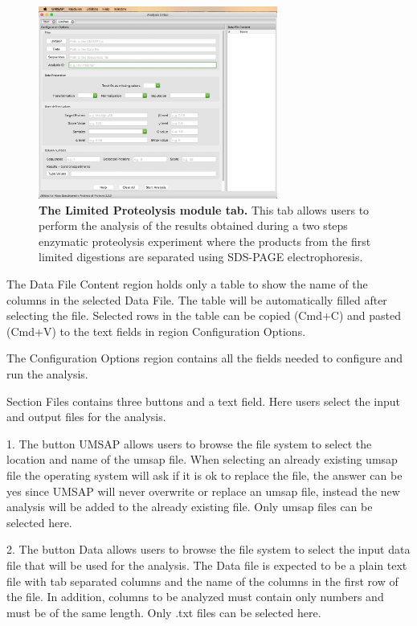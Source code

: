\begin{figure}[h]
    \centering
    \includegraphics[width=0.7\textwidth]{./IMAGES/MOD-LIMPROT/limprot-mod.jpg}
    \caption[The Limited Proteolysis module tab]{\textbf{The Limited Proteolysis
    module tab.} This tab allows users to perform the analysis of the results obtained
    during a two steps enzymatic proteolysis experiment where the products from the
    first limited digestions are separated using SDS-PAGE electrophoresis.}
    \label{fig:limprotTab}
    \vspace{-5pt}
\end{figure}

The Data File Content region holds only a table to show the name of the columns in
the selected Data File. The table will be automatically filled after selecting the
file. Selected rows in the table can be copied (Cmd+C) and pasted (Cmd+V) to the
text fields in region Configuration Options.

The Configuration Options region contains all the fields needed to configure and
run the analysis.

Section Files contains three buttons and a text field. Here users select the input
and output files for the analysis.

\num{1}. The button UMSAP allows users to browse the file system to select the location
and name of the umsap file. When selecting an already existing umsap file the operating
system will ask if it is ok to replace the file, the answer can be yes since UMSAP
will never overwrite or replace an umsap file, instead the new analysis will be
added to the already existing file. Only umsap files can be selected here.

\num{2}. The button Data allows users to browse the file system to select the input
data file that will be used for the analysis. The Data file is expected to be a
plain text file with tab separated columns and the name of the columns in the first
row of the file. In addition, columns to be analyzed must contain only numbers and
must be of the same length. Only .txt files can be selected here.

